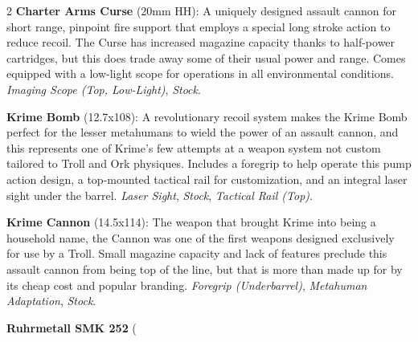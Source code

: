 \documentclass[
  oneside]{article}
\begin{document}
\begin{multicols}{2}
\textbf{Charter Arms Curse} (20mm HH): A uniquely
designed assault cannon for short range, pinpoint
fire support that employs a special long stroke
action to reduce recoil. The Curse has increased
magazine capacity thanks to half-power cartridges,
but this does trade away some of their usual power
and range. Comes equipped with a low-light scope
for operations in all environmental conditions.
\emph{Imaging Scope (Top, Low-Light)},
\emph{Stock}.

\textbf{Krime Bomb} (12.7x108): A revolutionary
recoil system makes the Krime Bomb perfect for the
lesser metahumans to wield the power of an assault
cannon, and this represents one of Krime's few
attempts at a weapon system not custom tailored to
Troll and Ork physiques. Includes a foregrip to
help operate this pump action design, a
top-mounted tactical rail for customization, and
an integral laser sight under the barrel.
\emph{Laser Sight}, \emph{Stock}, \emph{Tactical
Rail (Top)}.

\textbf{Krime Cannon} (14.5x114): The weapon that
brought Krime into being a household name, the
Cannon was one of the first weapons designed
exclusively for use by a Troll. Small magazine
capacity and lack of features preclude this
assault cannon from being top of the line, but
that is more than made up for by its cheap cost
and popular branding. \emph{Foregrip
(Underbarrel)}, \emph{Metahuman Adaptation},
\emph{Stock}.

\textbf{Ruhrmetall SMK 252} (

\end{multicols}
\end{document}
